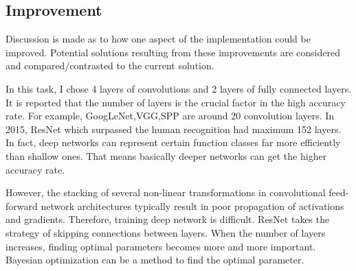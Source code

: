 \subsection{Improvement}
Discussion is made as to how one aspect of the implementation could be improved. Potential solutions resulting from these improvements are considered and compared/contrasted to the current solution.


In this task, I chose 4 layers of convolutions and 2 layers of fully connected layers. It is reported that the number of layers is the crucial factor in the high accuracy rate. For example, GoogLeNet,VGG,SPP are around 20 convolution layers. In 2015, ResNet which surpassed the human recognition had maximum 152 layers. In fact, deep networks can represent certain function classes far more efficiently than shallow ones. That means basically deeper networks can get the higher accuracy rate.

However, the stacking of several non-linear transformations in convolutional feed-forward network architectures typically result in poor propagation of activations and gradients. Therefore, training deep network is difficult. ResNet takes the strategy of skipping connections between layers. When the number of layers increases, finding optimal parameters becomes more and more important. Bayesian optimization can be a method to find the optimal parameter.  